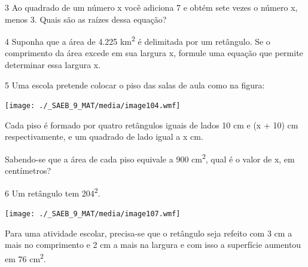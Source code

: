\begin{escolha}
\begin{escolha}
\begin{boxmedio}
\end{boxmedio}

\num{3} Ao quadrado de um número x você adiciona 7 e obtém sete vezes o
número x, menos 3. Quais são as raízes dessa equação?

\begin{boxpeq}
\end{boxpeq}

\num{4} Suponha que a área de 4.225 km\textsuperscript{2} é delimitada por um
retângulo. Se o comprimento da área excede em sua largura x, formule uma 
equação que permite determinar essa largura x.

\begin{boxpeq}
\end{boxpeq}

\num{5} Uma escola pretende colocar o piso das salas de aula como na
figura:

\texttt{[image: ./\_SAEB\_9\_MAT/media/image104.wmf]}

Cada piso é formado por quatro retângulos iguais de lados 10 cm e (x +
10) cm respectivamente, e um quadrado de lado igual a x cm.

Sabendo-se que a área de cada piso equivale a 900 cm\textsuperscript{2},
qual é o valor de x, em centímetros?

\begin{boxpeq}
\end{boxpeq}

\num{6} Um retângulo tem 204\textsuperscript{2}.

\texttt{[image: ./\_SAEB\_9\_MAT/media/image107.wmf]}

Para uma atividade escolar, precisa-se que o retângulo seja refeito com 3
cm a mais no comprimento e 2 cm a mais na largura e com isso a
superfície aumentou em 76 cm\textsuperscript{2}.


\end{escolha}
\end{escolha}
